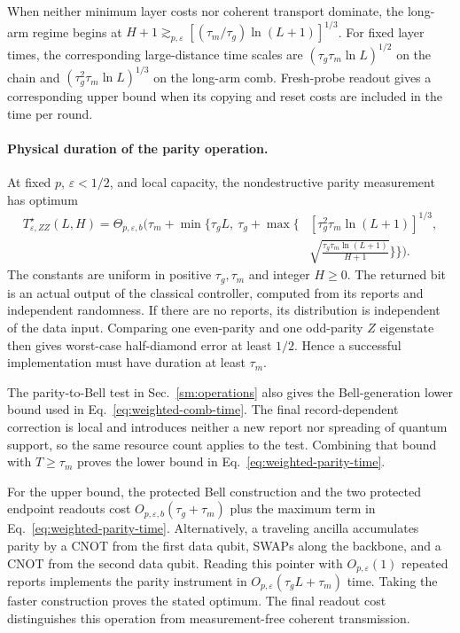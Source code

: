 \documentclass[aps,prl,twocolumn,superscriptaddress,longbibliography,reprint,floatfix]{revtex4-2}
\newcommand{\eps}{\varepsilon}
\begin{document}
When neither minimum layer costs nor coherent transport dominate,
the long-arm regime begins at
$H+1\gtrsim_{p,\eps}[(\tau_m/\tau_g)\ln(L+1)]^{1/3}$.
For fixed layer times, the corresponding large-distance time scales
are $(\tau_g\tau_m\ln L)^{1/2}$ on the chain and
$(\tau_g^2\tau_m\ln L)^{1/3}$ on the long-arm comb. Fresh-probe readout gives a corresponding upper bound
when its copying and reset costs are included in the time per round.

\paragraph*{Physical duration of the parity operation.}
At fixed $p$, $\eps<1/2$, and local capacity, the nondestructive parity
measurement has optimum
\begin{equation}
 \begin{split}
 T_{\eps,ZZ}^{\star}(L,H)=\Theta_{p,\eps,b}\!\Bigg(
 \tau_m+\min\Bigg\{\tau_gL,\ \tau_g+
 \max\bigg\{&[\tau_g^2\tau_m\ln(L+1)]^{1/3},\\[-2pt]
 &\sqrt{\frac{\tau_g\tau_m\ln(L+1)}{H+1}}\bigg\}\Bigg\}\Bigg).
 \end{split}
 \label{eq:weighted-parity-time}
\end{equation}
The constants are uniform in positive $\tau_g,\tau_m$ and integer $H\ge0$.
The returned bit is an actual output of the classical controller,
computed from its reports and independent randomness. If there are no
reports, its distribution is independent of the data input. Comparing
one even-parity and one odd-parity $Z$ eigenstate then gives worst-case
half-diamond error at least $1/2$. Hence a successful implementation
must have duration at least $\tau_m$.

The parity-to-Bell test in Sec.~\ref{sm:operations} also gives the
Bell-generation lower bound used in Eq.~\eqref{eq:weighted-comb-time}.
The final record-dependent correction is local and introduces neither
a new report nor spreading of quantum support, so the same resource
count applies to the test. Combining that bound with $T\ge\tau_m$
proves the lower bound in Eq.~\eqref{eq:weighted-parity-time}.

For the upper bound, the protected Bell construction and the two
protected endpoint readouts cost
$O_{p,\eps,b}(\tau_g+\tau_m)$ plus the maximum term in
Eq.~\eqref{eq:weighted-parity-time}. Alternatively, a traveling ancilla
accumulates parity by a CNOT from the first data qubit, SWAPs along the
backbone, and a CNOT from the second data qubit. Reading this pointer
with $O_{p,\eps}(1)$ repeated reports implements the parity instrument
in $O_{p,\eps}(\tau_g L+\tau_m)$ time. Taking the faster construction
proves the stated optimum. The final readout cost distinguishes this
operation from measurement-free coherent transmission.
\end{document}
